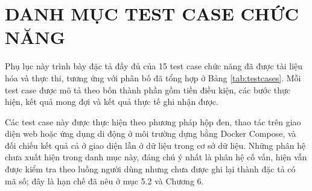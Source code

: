 \documentclass[12pt,a4paper,oneside]{report}
\begin{document}
\chapter{DANH MỤC TEST CASE CHỨC NĂNG}

Phụ lục này trình bày đặc tả đầy đủ của 15 test case chức năng đã được tài liệu hóa và thực thi, tương ứng với phân bố đã tổng hợp ở Bảng \ref{tab:testcases}. Mỗi test case được mô tả theo bốn thành phần gồm tiền điều kiện, các bước thực hiện, kết quả mong đợi và kết quả thực tế ghi nhận được.

Các test case này được thực hiện theo phương pháp hộp đen, thao tác trên giao diện web hoặc ứng dụng di động ở môi trường dựng bằng Docker Compose, và đối chiếu kết quả cả ở giao diện lẫn ở dữ liệu trong cơ sở dữ liệu. Những phân hệ chưa xuất hiện trong danh mục này, đáng chú ý nhất là phân hệ cố vấn, hiện vẫn được kiểm tra theo luồng người dùng nhưng chưa được ghi lại thành đặc tả có mã số; đây là hạn chế đã nêu ở mục 5.2 và Chương 6.
\end{document}
